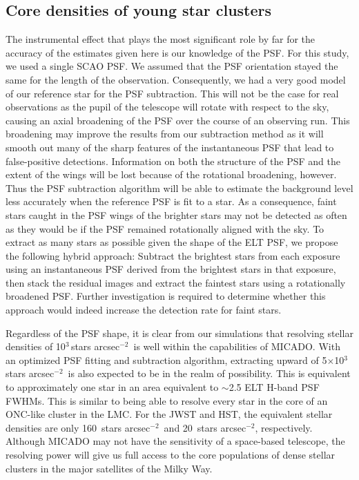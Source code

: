 \documentclass{aa}
\newcommand{\s}{$\sim$}
\newcommand{\h}[1]{$^{#1}$}
\newcommand{\spa}{stars arcsec$^{-2}$~}
\newcommand{\spae}{stars arcsec$^{-2}$}
\begin{document}
\subsection{Core densities of young star clusters}
  \label{subsec:core_densities}

The instrumental effect that plays the most significant role by far for the accuracy of the estimates given here is our knowledge of the PSF\@.
For this study, we used a single SCAO PSF\@.
We assumed that the PSF orientation stayed the same for the length of the observation.
Consequently, we had a very good model of our reference star for the PSF subtraction.
This will not be the case for real observations as the pupil of the telescope will rotate with respect to the sky, causing an axial broadening of the PSF over the course of an observing run.
This broadening may improve the results from our subtraction method as it will smooth out many of the sharp features of the instantaneous PSF that lead to false-positive detections.
Information on both the structure of the PSF and the extent of the wings will be lost because of the rotational broadening, however.
Thus the PSF subtraction algorithm will be able to estimate the background level less accurately when the reference PSF is fit to a star.
As a consequence, faint stars caught in the PSF wings of the brighter stars may not be detected as often as they would be if the PSF remained rotationally aligned with the sky.
To extract as many stars as possible given the shape of the ELT PSF, we propose the following hybrid approach: Subtract the brightest stars from each exposure using an instantaneous PSF derived from the brightest stars in that exposure, then stack the residual images and extract the faintest stars using a rotationally broadened PSF\@.
Further investigation is required to determine whether this approach would indeed increase the detection rate for faint stars.

Regardless of the PSF shape, it is clear from our simulations that resolving stellar densities of 10\h3\,\spa is well within the capabilities of MICADO\@.
With an optimized PSF fitting and subtraction algorithm, extracting upward of 5$\times$10\h3\,\spa is also expected to be in the realm of possibility.
This is equivalent to approximately one star in an area equivalent to \s2.5 ELT H-band PSF FWHMs.
This is similar to being able to resolve every star in the core of an ONC-like cluster in the LMC\@.
For the JWST and HST, the equivalent stellar densities are only 160~\spa and 20~\spae, respectively.
Although MICADO may not have the sensitivity of a space-based telescope, the resolving power will give us full access to the core populations of dense stellar clusters in the major satellites of the Milky Way.
\end{document}
